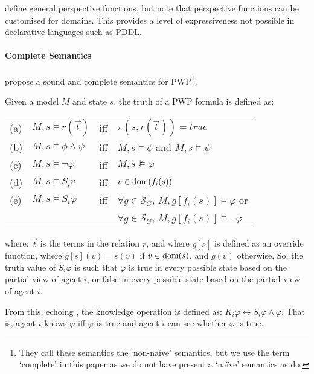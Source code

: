 \citeauthor{Hu2022-ul} define general perspective functions, but note that perspective functions can be customised for domains. This provides a level of expressiveness not possible in declarative languages such as PDDL.


\paragraph{Complete Semantics}
\citet{Hu2022-ul} propose a sound and complete semantics for PWP\footnote{They call these semantics the `non-na\"ive' semantics, but we use the term `complete' in this paper as we do not have present a `na\"ive' semantics as \citet{Hu2022-ul} do.}.

\begin{definition}
\label{def:pwp:individual_semantics}

Given a model $M$ and state $s$, the truth of a PWP formula is defined as:

\vspace{2mm}
\noindent
\begin{tabular}{ll@{~~}l@{~~~}l}
 (a) & $M,s \vDash r(\vec{t})$ & iff & $\pi(s, r(\vec{t})) = true$\\[1mm]
 (b) & $M,s \vDash \phi \land \psi$  & iff & $M,s \vDash \phi$ and $M,s \vDash \psi$\\[1mm]
 (c) & $M,s \vDash \neg \varphi$     & iff & $M,s \not\vDash \varphi$\\[1mm]
 (d) & $M,s \vDash S_i v$            & iff & $v \in \textrm{dom}(f_i(s))$\\[1mm]
 (e) & $M,s \vDash S_i \varphi$      & iff & 
     $\forall g \in \mathcal{S}_G$, $M,g[f_i(s)] \vDash \varphi$  or \\ 
   &  & & $\forall g \in \mathcal{S}_G$, $M,g[f_i(s)] \vDash \neg \varphi$ \\[1mm]
\end{tabular}
\vspace{2mm}
where: $\vec{t}$ is the terms in the relation $r$, and where $g[s]$ is defined as an override function, where $g[s](v) = s(v)$ if  $v \in \textrm{dom}(s)$, and $g(v)$ otherwise.
So, the truth value of $S_i \varphi$ is such that $\varphi$ is true in every possible state based on the partial view of agent $i$, or false in every possible state based on the partial view of agent $i$.

From this, echoing \citet{DBLP:conf/ecai/CooperHMMR16}, the knowledge operation is defined as:
$K_i \varphi \leftrightarrow S_i \varphi \land \varphi$.
That is, agent $i$ knows $\varphi$ iff $\varphi$ is true and agent $i$ can see whether $\varphi$ is true.
\end{definition}

